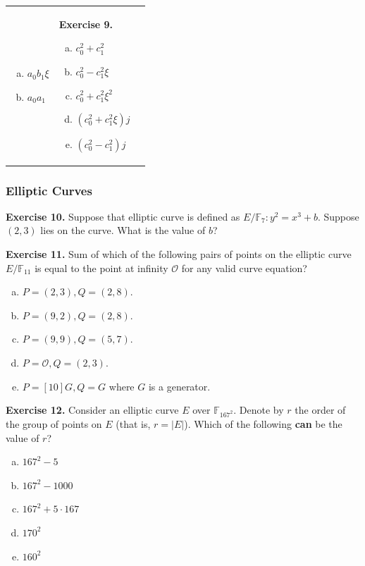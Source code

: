 \documentclass[../lecture-notes.tex]{subfiles}
\begin{document}
\begin{center}
\begin{tabular}{p{2.9cm}p{1.6cm}p{3cm}}
\begin{enumerate}[a)]
            \item $a_0b_1\xi$
            \item $a_0a_1$
        \end{enumerate} & 
        \textbf{Exercise 9.}
        \begin{enumerate}[a)]
            \item $c_0^2+c_1^2$
            \item $c_0^2-c_1^2\xi$
            \item $c_0^2+c_1^2\xi^2$
            \item $(c_0^2+c_1^2\xi)j$
            \item $(c_0^2-c_1^2)j$
        \end{enumerate} 
    \end{tabular}
\end{center}

\subsubsection*{Elliptic Curves}
\textbf{Exercise 10.} Suppose that elliptic curve is defined as $E/\mathbb{F}_{7}: y^2=x^3+b$. Suppose $(2,3)$ lies on the curve. What is the value of $b$?

\textbf{Exercise 11.} Sum of which of the following pairs of points on the elliptic curve $E/\mathbb{F}_{11}$ is equal to the point at infinity $\mathcal{O}$ for any valid curve equation?
\begin{enumerate}[a)]
    \item $P=(2,3),Q=(2,8)$.
    \item $P=(9,2),Q=(2,8)$.
    \item $P=(9,9),Q=(5,7)$.
    \item $P=\mathcal{O},Q=(2,3)$.
    \item $P=[10]G,Q=G$ where $G$ is a generator.
\end{enumerate}

\textbf{Exercise 12.} Consider an elliptic curve $E$ over $\mathbb{F}_{167^2}$. Denote by $r$ the order of the group of points on $E$ (that is, $r=|E|$). Which of the following \textbf{can} be the value of $r$?
\begin{enumerate}[a)]
    \item $167^2 - 5$
    \item $167^2-1000$
    \item $167^2+5 \cdot 167$
    \item $170^2$
    \item $160^2$
\end{enumerate}
\end{document}
